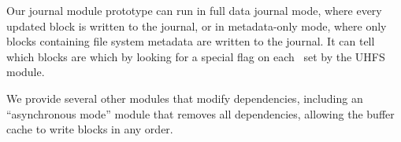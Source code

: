 

Our journal module prototype can run in full data journal mode, where every
updated block is written to the journal, or in metadata-only mode, where only
blocks containing file system metadata are written to the journal. It can
tell which blocks are which by looking for a special flag on each \patch\ set
by the UHFS module.

We provide several other modules that modify dependencies, including an
``asynchronous mode'' module that removes all dependencies, allowing the
buffer cache to write blocks in any order.
%
